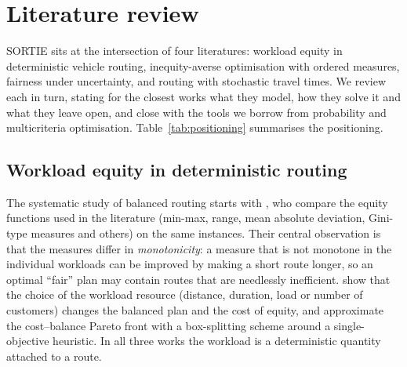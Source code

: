 \documentclass[11pt]{article}
\theoremstyle{definition}
\begin{document}
\section{Literature review}\label{sec:lit}

SORTIE sits at the intersection of four literatures: workload equity in
deterministic vehicle routing, inequity-averse optimisation with ordered
measures, fairness under uncertainty, and routing with stochastic travel
times. We review each in turn, stating for the closest works what they model,
how they solve it and what they leave open, and close with the tools we
borrow from probability and multicriteria optimisation.
Table~\ref{tab:positioning} summarises the positioning.

\subsection{Workload equity in deterministic routing}

The systematic study of balanced routing starts with
\citet{matl2018workload}, who compare the equity functions used in the
literature (min-max, range, mean absolute deviation, Gini-type
measures and others) on the same instances. Their central observation is
that the measures differ in \emph{monotonicity}: a measure that is not
monotone in the individual workloads can be improved by making a short route
longer, so an optimal ``fair'' plan may contain routes that are needlessly
inefficient. \citet{matl2019impact} show that the choice of the workload
resource (distance, duration, load or number of customers) changes the
balanced plan and the cost of equity, and
\citet{matl2019leveraging} approximate the cost--balance Pareto front with a
box-splitting scheme around a single-objective heuristic. In all three works
the workload is a deterministic quantity attached to a route.
\end{document}
